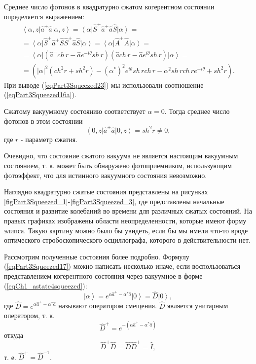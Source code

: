 Среднее число фотонов в квадратурно сжатом когерентном состоянии
определяется выражением:
\begin{eqnarray}
\left<\alpha, z\right|\hat{a}^{+}\hat{a}\left|\alpha, z\right> =
\left<\alpha\right|\hat{S}^{+}\hat{a}^{+}\hat{a}\hat{S}\left|\alpha\right>
=
\nonumber \\
=
\left<\alpha\right|\hat{S}^{+}\hat{a}^{+}\hat{S}\hat{S}^{+}\hat{a}\hat{S}\left|\alpha\right>
= 
\left<\alpha\right|\hat{A}^{+}\hat{A}\left|\alpha\right> =
\nonumber \\
=
\left<\alpha\right|
\left(\hat{a}^{+} ch\,r - \hat{a}e^{-i\theta}sh\,r\right)
\left(\hat{a} ch\,r - \hat{a} e^{i\theta}sh\,r\right)
\left|\alpha\right> = 
\nonumber \\
=
\left(
\left|\alpha\right|^2\left(ch^2 r + sh^2 r\right) -
\left(\alpha^{*}\right)^2
e^{i\theta} sh\,r ch\,r - 
\alpha^2 sh\,r ch\,r e^{- i\theta} + sh^2 r
\right).
\label{eqPart3Squeezed23}
\end{eqnarray}
При выводе (\ref{eqPart3Squeezed23}) мы использовали соотношение
(\ref{eqPart3Squeezed16a}).

Сжатому вакуумному состоянию соответствует $\alpha = 0$. Тогда среднее
число фотонов в этом состоянии
\begin{equation}
\left<0, z\right|\hat{a}^{+}\hat{a}\left|0, z\right> =
sh^2 r \ne 0,
\label{eqPart3Squeezed24}
\end{equation}
где $r$ - параметр сжатия.

Очевидно, что состояние сжатого вакуума не является настоящим
вакуумным состоянием, т. к. может быть обнаружено фотоприемником,
использующим фотоэффект, что для истинного вакуумного состояния
невозможно.




%
%

Наглядно квадратурно сжатые  состояния представлены на рисунках
\ref{figPart3Squeezed_1}-\ref{figPart3Squeezed_3}, где представлены
начальные состояния и развитие колебаний во 
времени для различных сжатых состояний. На правых графиках изображены
области неопределенности, которые имеют форму элипса. Такую картину
можно было бы увидеть, если бы мы имели что-то вроде оптического
стробоскопического осциллографа, которого в действительности нет.

Рассмотрим полученные состояния более подробно. Формулу
(\ref{eqPart3Squeezed17}) можно написать несколько иначе, если
воспользоваться представлением когерентного состояния через вакуумное
в форме (\ref{eqCh1_astate4squeezed}):
\begin{equation}
\left|\alpha\right> =  
e^{\alpha \hat{a}^{+} - \alpha^{*} \hat{a}}\left|0\right> = 
\hat{D}\left|0\right>,
\nonumber
\end{equation}
где $\hat{D} = e^{\alpha \hat{a}^{+} - \alpha^{*} \hat{a}}$ называют
оператором смещения. $\hat{D}$ является унитарным оператором, т. к. 
\[
\hat{D}^{+} = e^{-\left(\alpha \hat{a}^{+} - \alpha^{*} \hat{a}\right)}
\]
откуда
\[
\hat{D}^{+} \hat{D} = \hat{D} \hat{D}^{+} =\hat{I},
\]
т. е. $\hat{D}^{+} = \hat{D}^{-1}$.

